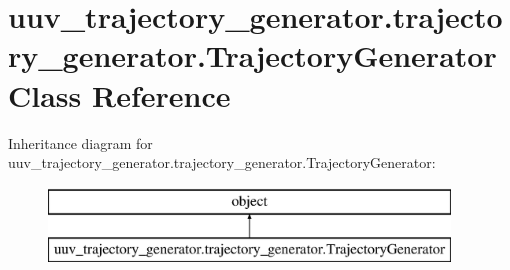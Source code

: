 \hypertarget{classuuv__trajectory__generator_1_1trajectory__generator_1_1TrajectoryGenerator}{}\section{uuv\+\_\+trajectory\+\_\+generator.\+trajectory\+\_\+generator.\+Trajectory\+Generator Class Reference}
\label{classuuv__trajectory__generator_1_1trajectory__generator_1_1TrajectoryGenerator}
Inheritance diagram for uuv\+\_\+trajectory\+\_\+generator.\+trajectory\+\_\+generator.\+Trajectory\+Generator\+:\begin{figure}[H]
\begin{center}
\leavevmode
\includegraphics[height=2.000000cm]{classuuv__trajectory__generator_1_1trajectory__generator_1_1TrajectoryGenerator}
\end{center}
\end{figure}
